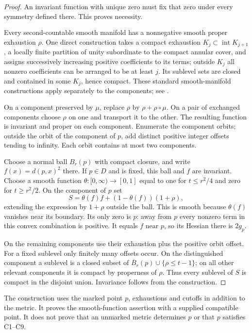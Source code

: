 \begin{proof}
An invariant function with unique zero must fix that zero under every
symmetry defined there. This proves necessity.

Every second-countable smooth manifold has a nonnegative smooth proper
exhaustion $\rho$. One direct construction takes a compact exhaustion
$K_j\subset\operatorname{int}K_{j+1}$, a locally finite partition of unity
subordinate to the compact annular cover, and assigns successively increasing
positive coefficients to its terms; outside $K_j$ all nonzero coefficients
can be arranged to be at least $j$. Its sublevel sets are closed and
contained in some $K_j$, hence compact. These standard smooth-manifold
constructions apply separately to the components; see \cite{Lee}.

On a component preserved by $\mu$, replace $\rho$ by
$\rho+\rho\circ\mu$. On a pair of exchanged components choose $\rho$ on
one and transport it to the other. The resulting function is invariant
and proper on each component. Enumerate the component orbits; outside
the orbit of the component of $p$, add distinct positive integer offsets
tending to infinity. Each orbit contains at most two components.

Choose a normal ball $B_r(p)$ with compact closure, and write
$f(x)=d(p,x)^2$ there. If $p\in D$ and is fixed, this ball and $f$ are
invariant. Choose a smooth function $\theta:[0,\infty)\to[0,1]$ equal to
one for $t\le r^2/4$ and zero for $t\ge r^2/2$. On the component of $p$ set
\[
 S=\theta(f)f+(1-\theta(f))(1+\rho),
\]
extending the expression by $1+\rho$ outside the ball. This is smooth
because $\theta(f)$ vanishes near its boundary. Its only zero is $p$:
away from $p$ every nonzero term in this convex combination is positive.
It equals $f$ near $p$, so its Hessian there is $2g_p$.

On the remaining components use their exhaustion plus the positive
orbit offset. For a fixed sublevel only finitely many offsets occur.
On the distinguished component a sublevel is a closed subset of
$\overline B_r(p)\cup\{\rho\le t-1\}$; on all other relevant components
it is compact by properness of $\rho$. Thus every sublevel of $S$ is
compact in the disjoint union. Invariance follows from the construction.
\end{proof}

\begin{remark}
The construction uses the marked point $p$, exhaustions and cutoffs in
addition to the metric. It proves the smooth-function assertion with a
supplied compatible point. It does not prove that an unmarked metric
determines $p$ or that $p$ satisfies C1--C9.
\end{remark}


